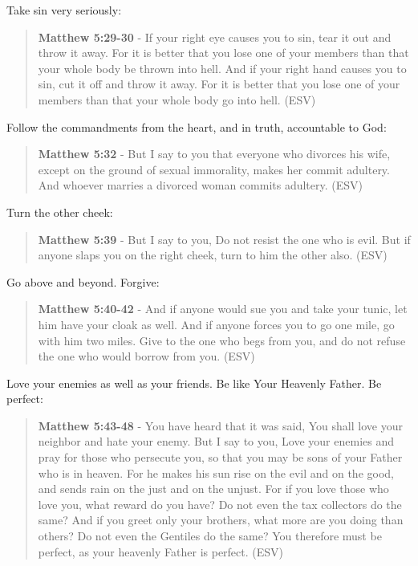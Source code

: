 \documentclass[11pt]{article}
\begin{document}
Take sin very seriously:

\begin{quote}
\textbf{Matthew 5:29-30} - If your right eye causes you to sin, tear it out and throw it away. For it is better that you lose one of your members than that your whole body be thrown into hell. And if your right hand causes you to sin, cut it off and throw it away. For it is better that you lose one of your members than that your whole body go into hell. (ESV)
\end{quote}

Follow the commandments from the heart, and in truth, accountable to God:

\begin{quote}
\textbf{Matthew 5:32} - But I say to you that everyone who divorces his wife, except on the ground of sexual immorality, makes her commit adultery. And whoever marries a divorced woman commits adultery. (ESV)
\end{quote}

Turn the other cheek:

\begin{quote}
\textbf{Matthew 5:39} - But I say to you, Do not resist the one who is evil. But if anyone slaps you on the right cheek, turn to him the other also. (ESV)
\end{quote}

Go above and beyond. Forgive:

\begin{quote}
\textbf{Matthew 5:40-42} - And if anyone would sue you and take your tunic, let him have your cloak as well. And if anyone forces you to go one mile, go with him two miles. Give to the one who begs from you, and do not refuse the one who would borrow from you. (ESV)
\end{quote}

Love your enemies as well as your friends. Be like Your Heavenly Father. Be perfect:

\begin{quote}
\textbf{Matthew 5:43-48} - You have heard that it was said, You shall love your neighbor and hate your enemy. But I say to you, Love your enemies and pray for those who persecute you, so that you may be sons of your Father who is in heaven. For he makes his sun rise on the evil and on the good, and sends rain on the just and on the unjust. For if you love those who love you, what reward do you have? Do not even the tax collectors do the same? And if you greet only your brothers, what more are you doing than others? Do not even the Gentiles do the same? You therefore must be perfect, as your heavenly Father is perfect. (ESV)
\end{quote}
\end{document}

